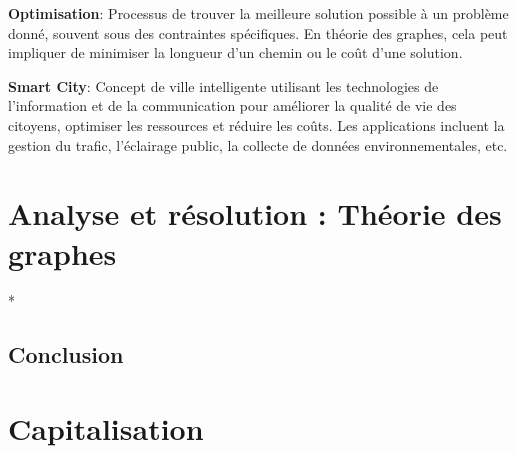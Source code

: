 \vspace{0.5cm}

\noindent \textbf{Optimisation}: Processus de trouver la meilleure solution possible à un problème donné, souvent sous des contraintes spécifiques. En théorie des graphes, cela peut impliquer de minimiser la longueur d'un chemin ou le coût d'une solution.

\vspace{0.5cm}

\noindent \textbf{Smart City}: Concept de ville intelligente utilisant les technologies de l'information et de la communication pour améliorer la qualité de vie des citoyens, optimiser les ressources et réduire les coûts. Les applications incluent la gestion du trafic, l'éclairage public, la collecte de données environnementales, etc.

\newpage

\section*{Analyse et résolution : Théorie des graphes}

\noindent 
*
\newpage

\subsection*{Conclusion}
{}

\noindent 

\newpage

\section*{Capitalisation}

